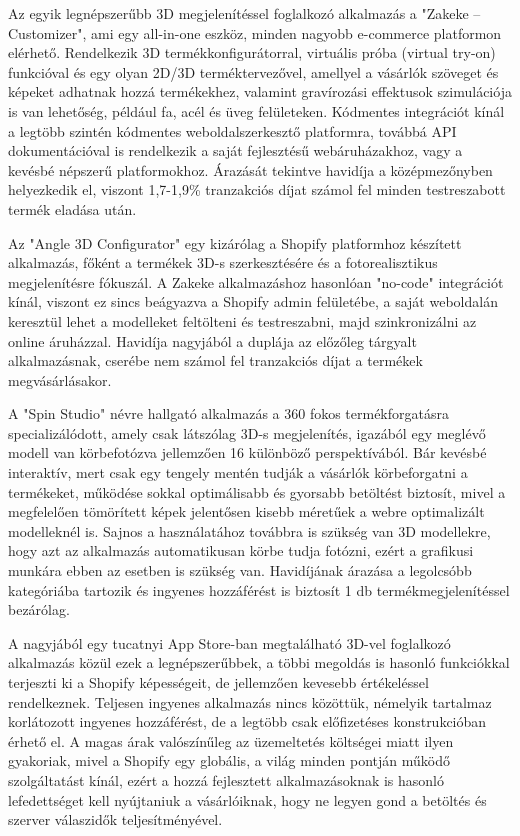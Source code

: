 \documentclass[12pt]{report}
\begin{document}
        Az egyik legnépszerűbb 3D megjelenítéssel foglalkozó alkalmazás a "Zakeke – Customizer", ami egy all-in-one eszköz, minden nagyobb e-commerce platformon elérhető. Rendelkezik 3D termékkonfigurátorral, virtuális próba (virtual try-on) funkcióval és egy olyan 2D/3D terméktervezővel, amellyel a vásárlók szöveget és képeket adhatnak hozzá termékekhez, valamint gravírozási effektusok szimulációja is van lehetőség, például fa, acél és üveg felületeken. Kódmentes integrációt kínál a legtöbb szintén kódmentes weboldalszerkesztő platformra, továbbá API dokumentációval is rendelkezik a saját fejlesztésű webáruházakhoz, vagy a kevésbé népszerű platformokhoz. Árazását tekintve havidíja a középmezőnyben helyezkedik el, viszont 1,7-1,9\% tranzakciós díjat számol fel minden testreszabott termék eladása után.

        Az "Angle 3D Configurator" egy kizárólag a Shopify platformhoz készített alkalmazás, főként a termékek 3D-s szerkesztésére és a fotorealisztikus megjelenítésre fókuszál. A Zakeke alkalmazáshoz hasonlóan "no-code" integrációt kínál, viszont ez sincs beágyazva a Shopify admin felületébe, a saját weboldalán keresztül lehet a modelleket feltölteni és testreszabni, majd szinkronizálni az online áruházzal. Havidíja nagyjából a duplája az előzőleg tárgyalt alkalmazásnak, cserébe nem számol fel tranzakciós díjat a termékek megvásárlásakor.
        
        A "Spin Studio" névre hallgató alkalmazás a 360 fokos termékforgatásra specializálódott, amely csak látszólag 3D-s megjelenítés, igazából egy meglévő modell van körbefotózva jellemzően 16 különböző perspektívából. Bár kevésbé interaktív, mert csak egy tengely mentén tudják a vásárlók körbeforgatni a termékeket, működése sokkal optimálisabb és gyorsabb betöltést biztosít, mivel a megfelelően tömörített képek jelentősen kisebb méretűek a webre optimalizált modelleknél is. Sajnos a használatához továbbra is szükség van 3D modellekre, hogy azt az alkalmazás automatikusan körbe tudja fotózni, ezért a grafikusi munkára ebben az esetben is szükség van. Havidíjának árazása a legolcsóbb kategóriába tartozik és ingyenes hozzáférést is biztosít 1 db termékmegjelenítéssel bezárólag. 
        
        A nagyjából egy tucatnyi App Store-ban megtalálható 3D-vel foglalkozó alkalmazás közül ezek a legnépszerűbbek, a többi megoldás is hasonló funkciókkal terjeszti ki a Shopify képességeit, de jellemzően kevesebb értékeléssel rendelkeznek. Teljesen ingyenes alkalmazás nincs közöttük, némelyik tartalmaz korlátozott ingyenes hozzáférést, de a legtöbb csak előfizetéses konstrukcióban érhető el. A magas árak valószínűleg az üzemeltetés költségei miatt ilyen gyakoriak, mivel a Shopify egy globális, a világ minden pontján működő szolgáltatást kínál, ezért a hozzá fejlesztett alkalmazásoknak is hasonló lefedettséget kell nyújtaniuk a vásárlóiknak, hogy ne legyen gond a betöltés és szerver válaszidők teljesítményével.
        
\end{document}
